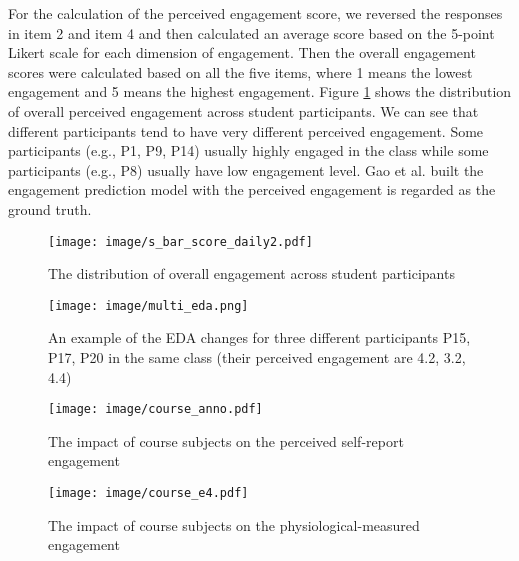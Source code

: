 \documentclass[sigconf]{acmart}
\begin{document}
For the calculation of the perceived engagement score, we reversed the responses in item 2 and item 4 and then calculated an average score based on the 5-point Likert scale for each dimension of engagement. Then the overall engagement scores were calculated based on all the five items, where 1 means the lowest engagement and 5 means the highest engagement. Figure \ref{fig:dis_engage} shows the distribution of overall perceived engagement across student participants. We can see that different participants tend to have very different perceived engagement. Some participants (e.g., P1, P9, P14) usually highly engaged in the class while some participants (e.g., P8) usually have low engagement level. Gao et al. \cite{gao2020n} built the engagement prediction model with the perceived engagement is regarded as the ground truth.

\begin{figure}
    \centering
    \texttt{[image: image/s\_bar\_score\_daily2.pdf]}
    \caption{The distribution of overall engagement across student participants}
    \label{fig:dis_engage}
\end{figure}




\begin{figure}
    \centering
    \texttt{[image: image/multi\_eda.png]}
    \caption{An example of the EDA changes for three different participants P15, P17, P20 in the same class (their perceived engagement are 4.2, 3.2, 4.4)}
    \label{fig:multi_eda}
\end{figure}

\begin{figure*}
    \centering
    \texttt{[image: image/course\_anno.pdf]}
    \caption{The impact of course subjects on the perceived self-report engagement}
    \label{fig:impact_subject_anno}
\end{figure*}
\begin{figure*}
    \centering
    \texttt{[image: image/course\_e4.pdf]}
    \caption{The impact of course subjects on the physiological-measured engagement}
    \label{fig:impact_subject}
\end{figure*}
\end{document}
